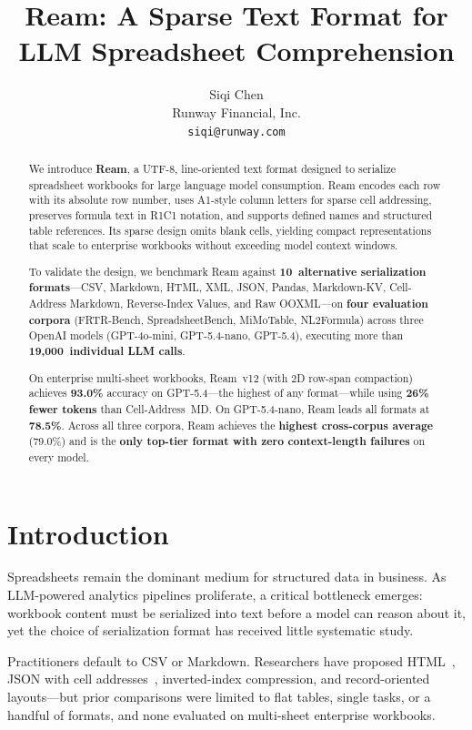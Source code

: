 \documentclass[11pt]{article}
\title{Ream: A Sparse Text Format for LLM Spreadsheet Comprehension}
\author{Siqi Chen\\
Runway Financial, Inc.\\
\texttt{siqi@runway.com}}
\date{}
\begin{document}
\maketitle

\begin{abstract}
We introduce \textbf{Ream}, a UTF-8, line-oriented text format designed to serialize spreadsheet workbooks for large language model consumption.
Ream encodes each row with its absolute row number, uses A1-style column letters for sparse cell addressing, preserves formula text in R1C1 notation, and supports defined names and structured table references.
Its sparse design omits blank cells, yielding compact representations that scale to enterprise workbooks without exceeding model context windows.

To validate the design, we benchmark Ream against \textbf{10~alternative serialization formats}---CSV, Markdown, HTML, XML, JSON, Pandas, Markdown-KV, Cell-Address Markdown, Reverse-Index Values, and Raw OOXML---on \textbf{four evaluation corpora} (FRTR-Bench, SpreadsheetBench, MiMoTable, NL2Formula) across three OpenAI models (GPT-4o-mini, GPT-5.4-nano, GPT-5.4), executing more than \textbf{19,000~individual LLM calls}.

On enterprise multi-sheet workbooks, Ream~v12 (with 2D row-span compaction) achieves \textbf{93.0\%} accuracy on GPT-5.4---the highest of any format---while using \textbf{26\% fewer tokens} than Cell-Address~MD.
On GPT-5.4-nano, Ream leads all formats at \textbf{78.5\%}.
Across all three corpora, Ream achieves the \textbf{highest cross-corpus average} (79.0\%) and is the \textbf{only top-tier format with zero context-length failures} on every model.
\end{abstract}

\section{Introduction}
\label{sec:intro}

Spreadsheets remain the dominant medium for structured data in business.
As LLM-powered analytics pipelines proliferate, a critical bottleneck emerges: workbook content must be serialized into text before a model can reason about it, yet the choice of serialization format has received little systematic study.

Practitioners default to CSV or Markdown.
Researchers have proposed HTML~\citep{sui2024table}, JSON with cell addresses~\citep{dong2024spreadsheetllm}, inverted-index compression, and record-oriented layouts---but prior comparisons were limited to flat tables, single tasks, or a handful of formats, and none evaluated on multi-sheet enterprise workbooks.
\end{document}

